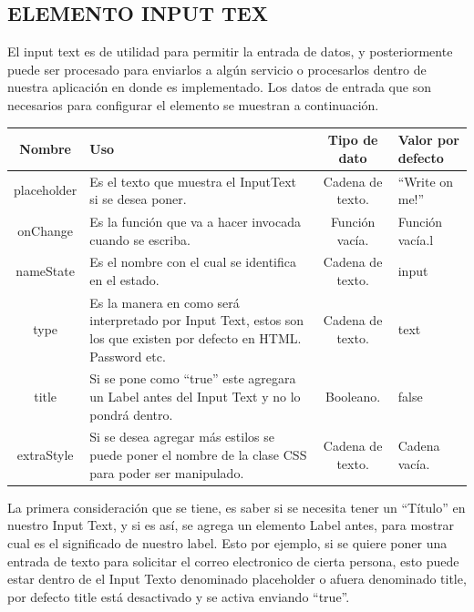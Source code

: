\subsection{ELEMENTO INPUT TEX}
El input text es de utilidad para permitir la entrada de datos, y posteriormente puede ser procesado para enviarlos a algún servicio o procesarlos dentro de nuestra aplicación en donde es implementado.
Los datos de entrada que son necesarios para configurar el elemento se muestran a continuación.
\newline
\newline
\begin{center}
 \begin{tabular}{ | c |  p{5cm}  | c | p{3cm} |} 
 \hline
 \textbf{Nombre} &  \textbf{Uso} &  \textbf{ Tipo de dato} &  \textbf{Valor por defecto}\\ [0.5ex] 
 \hline\hline
placeholder &Es el texto que muestra el InputText si se desea poner.  &  Cadena de texto. 	& “Write on me!” \\  [2.5ex] 
 \hline
onChange & Es la función que va a hacer invocada cuando se escriba.     & Función vacía.  	& Función vacía.l \\[2.5ex] 
 \hline
nameState & Es el nombre con el cual se identifica en el estado.    & Cadena de texto.	& input \\[3.5ex] 
 \hline
 type   & Es la manera en como será interpretado por Input Text, estos son los que existen por defecto en HTML. Password etc.&  Cadena de texto.	& text \\[2.5ex] 
 \hline
 title  & Si se pone como “true” este agregara un Label antes del Input Text y no lo pondrá dentro.&  Booleano.	& false \\[2.5ex] 
 \hline
 extraStyle   & Si se desea agregar más estilos se puede poner el nombre de la clase CSS para poder ser manipulado.&  Cadena de texto. 	& Cadena vacía. \\[2.5ex] 
 \hline
\end{tabular}
\end{center}
\newline
\newline
La primera consideración que se tiene, es saber si se necesita tener un “Título” en nuestro Input Text, y si es así, se agrega un elemento Label antes,  para mostrar cual es el significado de nuestro label. Esto por ejemplo, si se quiere poner una entrada de texto para solicitar el correo electronico de cierta persona, esto puede estar dentro de el Input Texto denominado placeholder o afuera denominado title, por defecto title está desactivado y se activa enviando “true”.
